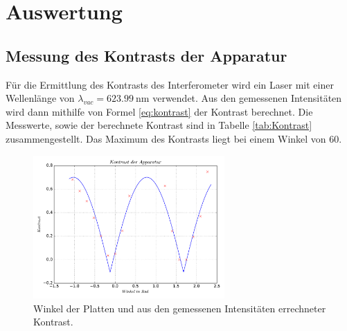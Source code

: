 \section{Auswertung}
\subsection{Messung des Kontrasts der Apparatur}
Für die Ermittlung des Kontrasts des Interferometer wird ein Laser mit einer Wellenlänge von $\lambda_{vac}=\SI{623.99}{\nano\meter}$\cite{Anleitung} verwendet.
Aus den gemessenen Intensitäten wird dann mithilfe von Formel \eqref{eq:kontrast} der Kontrast berechnet.
Die Messwerte, sowie der berechnete Kontrast sind in Tabelle \ref{tab:Kontrast} zusammengestellt.
Das Maximum des Kontrasts liegt bei einem Winkel von 60\circ.\\
\begin{figure}[H]
  \center
  \includegraphics[width=0.65\textwidth]{./plots/kontrastplot.pdf}
  \caption{Winkel der Platten und aus den gemessenen Intensitäten errechneter Kontrast.}
  \label{fig:kontrastplot}
\end{figure}
